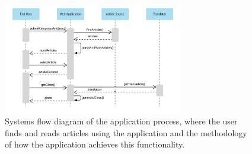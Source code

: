 \begin{figure}
	\caption[Systems Flow Diagram of the Application]{Systems flow diagram of the application process, where the user finds and reads articles using the application and the methodology of how the application achieves this functionality.}
	\label{fig:sf}
	\begin{center}
	\includegraphics[width=0.7\textwidth]{Graphics/SystemsFlowNew}
\end{center}
\end{figure}